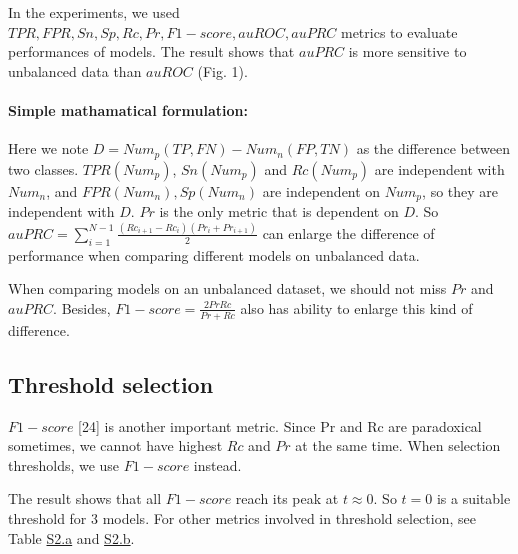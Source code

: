 \documentclass[11pt]{article}
\begin{document}
In the experiments, we used
\(TPR, FPR, Sn, Sp, Rc, Pr, F1-score, auROC, auPRC\) metrics to evaluate
performances of models. The result shows that \(auPRC\) is more
sensitive to unbalanced data than \(auROC\) (Fig. 1).

\hypertarget{simple-mathamatical-formulation}{%
\paragraph{Simple mathamatical
formulation:}\label{simple-mathamatical-formulation}}

Here we note \(D=Num_p(TP,FN)-Num_n(FP,TN)\) as the difference between
two classes. \(TPR(Num_p)\), \(Sn(Num_p)\) and \(Rc(Num_p)\) are
independent with \(Num_n\), and \(FPR(Num_n), Sp(Num_n)\) are
independent on \(Num_p\), so they are independent with \(D\). \(Pr\) is
the only metric that is dependent on \(D\). So
\(auPRC=\sum_{i=1}^{N-1}\frac{(Rc_{i+1} - Rc_i)(Pr_i+Pr_{i+1})}{2}\) can
enlarge the difference of performance when comparing different models on
unbalanced data.

When comparing models on an unbalanced dataset, we should not miss
\(Pr\) and \(auPRC\). Besides, \(F1-score=\frac{2Pr Rc}{Pr+Rc}\) also
has ability to enlarge this kind of difference.

    \hypertarget{threshold-selection}{%
\subsection{Threshold selection}\label{threshold-selection}}

\(F1-score\) {[}24{]} is another important metric. Since Pr and Rc are
paradoxical sometimes, we cannot have highest \(Rc\) and \(Pr\) at the
same time. When selection thresholds, we use \(F1-score\) instead.

The result shows that all \(F1-score\) reach its peak at \(t\approx 0\).
So \(t=0\) is a suitable threshold for 3 models. For other metrics
involved in threshold selection, see Table
\href{https://github.com/AdeBC/GSSR/blob/master/Figures/Table_S2.a.csv}{S2.a}
and
\href{https://github.com/AdeBC/GSSR/blob/master/Figures/Table_S2.b.csv}{S2.b}.
\end{document}
